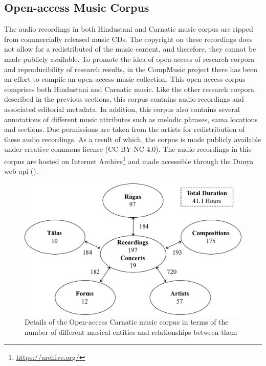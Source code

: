 \subsection{Open-access Music Corpus}
\label{sec:corpus_open_access_research_corpus}

The audio recordings in both Hindustani and Carnatic music corpus are ripped from commercially released music CDs. The copyright on these recordings does not allow for a redistributed of the music content, and therefore, they cannot be made publicly available. To promote the idea of open-access of research corpora and reproducibility of research results, in the CompMusic project there has been an effort to compile an open-access music collection. This open-access corpus comprises both Hindustani and Carnatic music. Like the other research corpora described in the previous sections, this corpus contains audio recordings and associated editorial metadata. In addition, this corpus also contains several annotations of different music attributes such as melodic phrases, sama locations and sections. Due permissions are taken from the artists for redistribution of these audio recordings. As a result of which, the corpus is made publicly available under creative commons license (CC BY-NC 4.0). The audio recordings in this corpus are hosted on Internet Archive\footnote{\url{https://archive.org/}} and made accessible through the Dunya web \gls{api} (). 


\begin{figure}
	\begin{center}
		\includegraphics[width=\figSizeNinety]{ch04_datasets/figures/carnatic_corpus_cc.pdf}
	\end{center}
	\caption[Details of the Open-access Carnatic music corpus]{Details of the Open-access Carnatic music corpus in terms of the number of different musical entities and relationships between them}
	\label{fig:carnatic_cc_corpus_details}
\end{figure}

